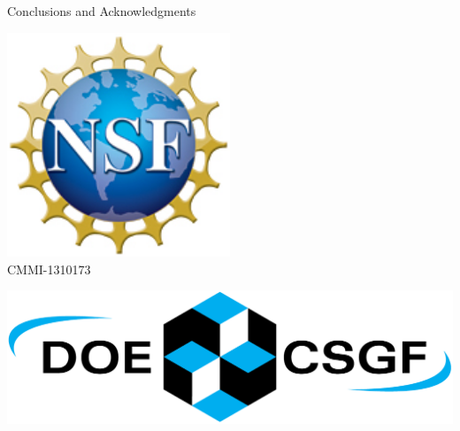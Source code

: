 \documentclass[10pt]{beamer}
\begin{document}
\begin{frame}{Conclusions and Acknowledgments}
    \centering
    \begin{minipage}{0.3\textwidth}
    	\centering
    	\includegraphics[width=0.5\textwidth]{nsf1.jpg}\\
		{\footnotesize CMMI-1310173}
    \end{minipage}
    \hfill
    \begin{minipage}{0.3\textwidth}
	    \centering
    	\includegraphics[width=\textwidth]{CSGF_horiz_1200x360.png}
    \end{minipage}
    
\end{frame}
\end{document}
